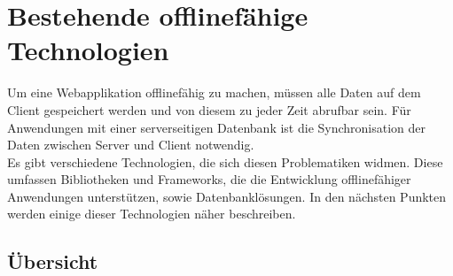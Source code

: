 %
%
\chapter{\label{chap:state}Bestehende offlinefähige Technologien}
Um eine Webapplikation offlinefähig zu machen, müssen alle Daten auf dem Client gespeichert werden und von diesem zu jeder Zeit abrufbar sein.
Für Anwendungen mit einer serverseitigen Datenbank ist die Synchronisation der Daten zwischen Server und Client notwendig.\\
Es gibt verschiedene Technologien, die sich diesen Problematiken widmen.
Diese umfassen Bibliotheken und Frameworks, die die Entwicklung offlinefähiger Anwendungen unterstützen, sowie Datenbanklösungen. In den nächsten Punkten werden einige dieser Technologien näher beschreiben.
%
%

%
%

%
%

%
%

%
%

%
\clearpage
\section{Übersicht}
